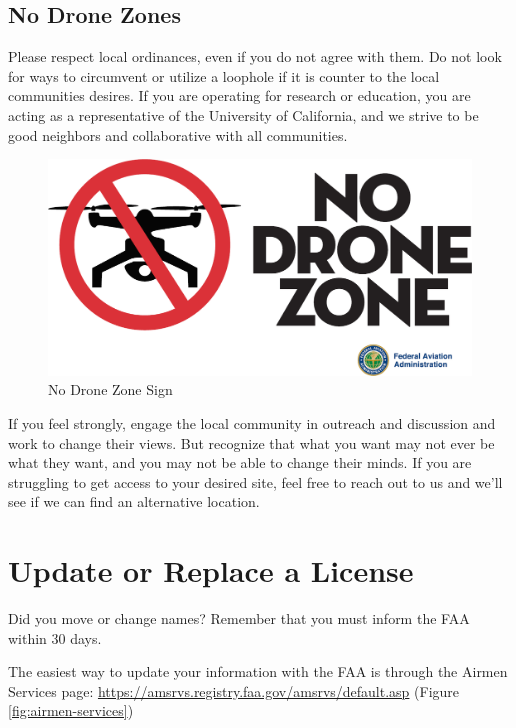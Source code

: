 \documentclass[
  12pt,
]{book}
\begin{document}
\subsection{No Drone Zones}\label{no-drone-zones}

Please respect local ordinances, even if you do not agree with them. Do not look for ways to circumvent or utilize a loophole if it is counter to the local communities desires. If you are operating for research or education, you are acting as a representative of the University of California, and we strive to be good neighbors and collaborative with all communities.

\begin{figure}

{\centering \includegraphics[width=0.8\linewidth]{images/no-drone-zone} 

}

\caption{No Drone Zone Sign}\label{fig:no-drone-zone}
\end{figure}

If you feel strongly, engage the local community in outreach and discussion and work to change their views. But recognize that what you want may not ever be what they want, and you may not be able to change their minds. If you are struggling to get access to your desired site, feel free to reach out to us and we'll see if we can find an alternative location.

\section{Update or Replace a License}\label{replace-license}

Did you move or change names? Remember that you must inform the FAA within 30 days.

The easiest way to update your information with the FAA is through the Airmen Services page: \url{https://amsrvs.registry.faa.gov/amsrvs/default.asp} (Figure \ref{fig:airmen-services})
\end{document}
